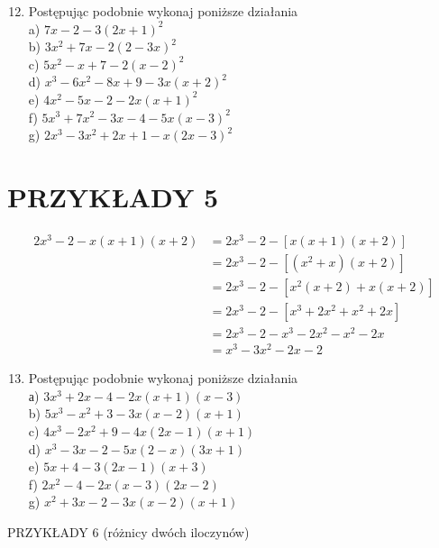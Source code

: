 \documentclass[10pt]{article}
\begin{document}
\begin{enumerate}
  \setcounter{enumi}{11}
  \item Postępując podobnie wykonaj poniższe działania\\
a) \(7 x-2-3(2 x+1)^{2}\)\\
b) \(3 x^{2}+7 x-2(2-3 x)^{2}\)\\
c) \(5 x^{2}-x+7-2(x-2)^{2}\)\\
d) \(x^{3}-6 x^{2}-8 x+9-3 x(x+2)^{2}\)\\
e) \(4 x^{2}-5 x-2-2 x(x+1)^{2}\)\\
f) \(5 x^{3}+7 x^{2}-3 x-4-5 x(x-3)^{2}\)\\
g) \(2 x^{3}-3 x^{2}+2 x+1-x(2 x-3)^{2}\)
\end{enumerate}

\section*{PRZYKŁADY 5}
\[
\begin{aligned}
2 x^{3}-2-x(x+1)(x+2) & =2 x^{3}-2-[x(x+1)(x+2)] \\
& =2 x^{3}-2-\left[\left(x^{2}+x\right)(x+2)\right] \\
& =2 x^{3}-2-\left[x^{2}(x+2)+x(x+2)\right] \\
& =2 x^{3}-2-\left[x^{3}+2 x^{2}+x^{2}+2 x\right] \\
& =2 x^{3}-2-x^{3}-2 x^{2}-x^{2}-2 x \\
& =x^{3}-3 x^{2}-2 x-2
\end{aligned}
\]

\begin{enumerate}
  \setcounter{enumi}{12}
  \item Postępując podobnie wykonaj poniższe działania\\
а) \(3 x^{3}+2 x-4-2 x(x+1)(x-3)\)\\
b) \(5 x^{3}-x^{2}+3-3 x(x-2)(x+1)\)\\
c) \(4 x^{3}-2 x^{2}+9-4 x(2 x-1)(x+1)\)\\
d) \(x^{3}-3 x-2-5 x(2-x)(3 x+1)\)\\
e) \(5 x+4-3(2 x-1)(x+3)\)\\
f) \(2 x^{2}-4-2 x(x-3)(2 x-2)\)\\
g) \(x^{2}+3 x-2-3 x(x-2)(x+1)\)
\end{enumerate}

PRZYKŁADY 6 (różnicy dwóch iloczynów)
\end{document}
